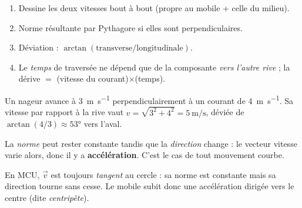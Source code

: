 \documentclass[11pt,a4paper]{article}
\newcommand{\vv}[1]{\vec{#1}}\newcommand{\ds}{\displaystyle}
\begin{document}
\begin{methode}
\begin{enumerate}[label=\arabic*.,leftmargin=1.6em,topsep=1pt,itemsep=0pt]
  \item Dessine les deux vitesses bout à bout (propre au mobile + celle du milieu).
  \item Norme résultante par Pythagore si elles sont perpendiculaires.
  \item Déviation : $\arctan(\text{transverse}/\text{longitudinale})$.
  \item Le \emph{temps} de traversée ne dépend que de la composante \emph{vers l'autre rive} ; la dérive $=$ (vitesse du courant)$\times$(temps).
\end{enumerate}
\begin{center}
\end{center}
\end{methode}

\begin{exemplebox}
Un nageur avance à \qty{3}{\metre\per\second} perpendiculairement à un courant de \qty{4}{\metre\per\second}.
Sa vitesse par rapport à la rive vaut $v=\sqrt{3^2+4^2}=\qty{5}{\metre\per\second}$, déviée de $\arctan(4/3)\approx\ang{53}$ vers l'aval.
\end{exemplebox}

\begin{piege}
La \emph{norme} peut rester constante tandis que la \emph{direction} change : le vecteur vitesse
varie alors, donc il y a \textbf{accélération}. C'est le cas de tout mouvement courbe.
\end{piege}

\begin{remarque}
En MCU, $\vv{v}$ est toujours \emph{tangent} au cercle : sa norme est constante mais sa direction
tourne sans cesse. Le mobile subit donc une accélération dirigée vers le centre (dite \emph{centripète}).
\end{remarque}
\end{document}
